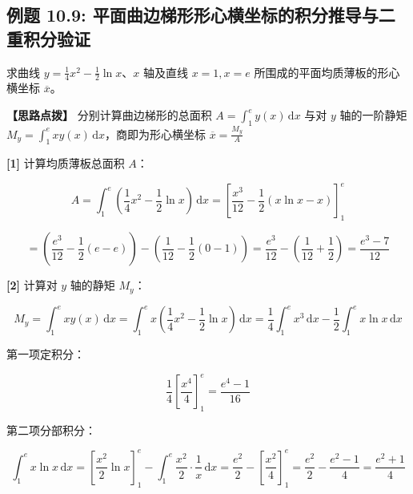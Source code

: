 \documentclass[11pt,a4paper,UTF8]{ctexart}
\begin{document}
\subsection{例题 10.9: 平面曲边梯形形心横坐标的积分推导与二重积分验证}

求曲线 $y = \frac{1}{4}x^2 - \frac{1}{2}\ln x$、$x$ 轴及直线 $x = 1, x = e$ 所围成的平面均质薄板的形心横坐标 $\overline{x}$。

\textbf{\color{DeepPurple}【思路点拨】} 分别计算曲边梯形的总面积 $A = \int_1^e y(x)\,\mathrm{d}x$ 与对 $y$ 轴的一阶静矩 $M_y = \int_1^e x y(x)\,\mathrm{d}x$，商即为形心横坐标 $\overline{x} = \frac{M_y}{A}$


\begin{solbox}[分步推导与答题规范]
\textbf{[1]} 计算均质薄板总面积 $A$：


\begin{equation*}
A = \int_1^e \left(\frac{1}{4}x^2 - \frac{1}{2}\ln x\right)\,\mathrm{d}x = \left[\frac{x^3}{12} - \frac{1}{2}(x\ln x - x)\right]_1^e
\end{equation*}



\begin{equation*}
= \left(\frac{e^3}{12} - \frac{1}{2}(e - e)\right) - \left(\frac{1}{12} - \frac{1}{2}(0 - 1)\right) = \frac{e^3}{12} - \left(\frac{1}{12} + \frac{1}{2}\right) = \frac{e^3-7}{12}
\end{equation*}


\textbf{[2]} 计算对 $y$ 轴的静矩 $M_y$：


\begin{equation*}
M_y = \int_1^e x y(x)\,\mathrm{d}x = \int_1^e x \left(\frac{1}{4}x^2 - \frac{1}{2}\ln x\right)\,\mathrm{d}x = \frac{1}{4}\int_1^e x^3\,\mathrm{d}x - \frac{1}{2}\int_1^e x\ln x\,\mathrm{d}x
\end{equation*}


第一项定积分：


\begin{equation*}
\frac{1}{4}\left[\frac{x^4}{4}\right]_1^e = \frac{e^4-1}{16}
\end{equation*}


第二项分部积分：


\begin{equation*}
\int_1^e x\ln x\,\mathrm{d}x = \left[\frac{x^2}{2}\ln x\right]_1^e - \int_1^e \frac{x^2}{2} \cdot \frac{1}{x}\,\mathrm{d}x = \frac{e^2}{2} - \left[\frac{x^2}{4}\right]_1^e = \frac{e^2}{2} - \frac{e^2-1}{4} = \frac{e^2+1}{4}
\end{equation*}



\end{solbox}
\end{document}
